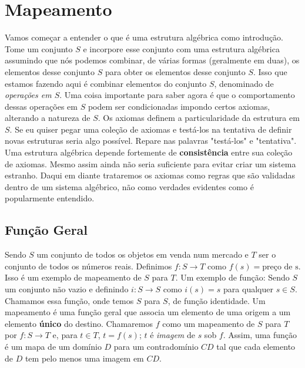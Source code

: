 




\section{Mapeamento}
Vamos começar a entender o que é uma estrutura algébrica como introdução. Tome um conjunto $S$ e incorpore esse conjunto com uma estrutura algébrica assumindo que nós podemos combinar, de várias formas (geralmente em duas), os elementos desse conjunto $S$ para obter os elementos desse conjunto $S$. Isso que estamos fazendo aqui é combinar elementos do conjunto $S$, denominado de \textit{operações em $S$}. Uma coisa importante para saber agora é que o comportamento dessas operações em $S$ podem ser condicionadas impondo certos axiomas, alterando a natureza de $S$. Os axiomas definem a particularidade da estrutura em $S$. Se eu quiser pegar uma coleção de axiomas e testá-los na tentativa de definir novas estruturas seria algo possível. Repare nas palavras "testá-los" e "tentativa". Uma estrutura algébrica depende fortemente de \textbf{consistência} entre sua coleção de axiomas. Mesmo assim ainda não seria suficiente para evitar criar um sistema estranho. Daqui em diante trataremos os axiomas como regras que são validadas dentro de um sistema algébrico, não como verdades evidentes como é popularmente entendido.
\subsection{Função Geral}
Sendo $S$ um conjunto de todos os objetos em venda num mercado e $T$ ser o conjunto de todos os números reais. Definimos $f:S \to T$ como $f(s) = \textrm{preço de s}$. Isso é um exemplo de mapeamento de $S$ para $T$.
Um exemplo de função: Sendo $S$ um conjunto não vazio e definindo $i:S \to S$ como $i(s) = s$ para qualquer $s \in S$. Chamamos essa função, onde temos $S$ para $S$, de função identidade.\newline
Um mapeamento é uma função geral que associa um elemento de uma origem a um elemento \textbf{único} do destino. Chamaremos $f$ como um mapeamento de $S$ para $T$ por $f:S \to T$ e, para $t \in T$, $t = f(s)$; $t$ é \textit{imagem} de $s$ sob $f$.
Assim, uma função é um mapa de um domínio $D$ para um contradomínio $CD$ tal que cada elemento de $D$ tem pelo menos uma imagem em $CD$.

